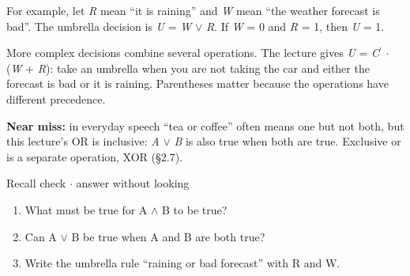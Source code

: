 \documentclass[11pt]{article}
\begin{document}
\begin{keepsection}
\begin{keepsection}
For example, let \textit{R} mean “it is raining” and \textit{W} mean “the weather forecast is bad”. The umbrella decision is \textit{U} = \textit{W} \ensuremath{\lor} \textit{R}. If \textit{W} = 0 and \textit{R} = 1, then \textit{U} = 1.

More complex decisions combine several operations. The lecture gives \textit{U} = \textit{C}\ensuremath{{}^{\prime}} \ensuremath{\cdot} (\textit{W} + \textit{R}): take an umbrella when you are not taking the car and either the forecast is bad or it is raining. Parentheses matter because the operations have different precedence.

\begin{notebox}\textbf{Near miss:} in everyday speech “tea or coffee” often means one but not both, but this lecture’s OR is inclusive: \textit{A} \ensuremath{\lor} \textit{B} is also true when both are true. Exclusive or is a separate operation, XOR (§2.7).\end{notebox}

\begin{recallbox}{Recall check \ensuremath{\cdot} answer without looking}
\begin{enumerate}
\item What must be true for A \ensuremath{\land} B to be true?
\item Can A \ensuremath{\lor} B be true when A and B are both true?
\item Write the umbrella rule “raining or bad forecast” with R and W.
\end{enumerate}

\end{recallbox}
\end{keepsection}
\end{keepsection}
\end{document}
